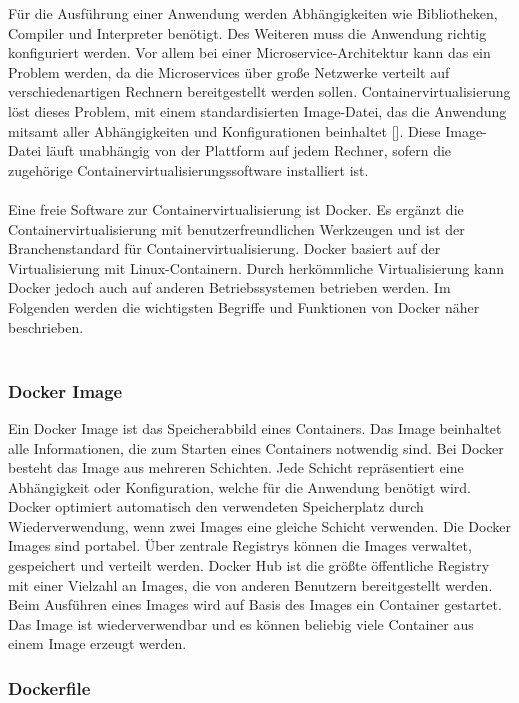 Für die Ausführung einer Anwendung werden Abhängigkeiten wie Bibliotheken, Compiler und Interpreter benötigt. Des Weiteren muss die Anwendung richtig konfiguriert werden. Vor allem bei einer Microservice-Architektur kann das ein Problem werden, da die Microservices über große Netzwerke verteilt auf verschiedenartigen Rechnern bereitgestellt werden sollen. Containervirtualisierung löst dieses Problem, mit einem standardisierten Image-Datei, das die Anwendung mitsamt aller Abhängigkeiten und Konfigurationen beinhaltet [\cite[S. 9]{arundelCloud2019}]. Diese Image-Datei läuft unabhängig von der Plattform auf jedem Rechner, sofern die zugehörige Containervirtualisierungssoftware installiert ist. \\
\\
Eine freie Software zur Containervirtualisierung ist Docker. Es ergänzt die Containervirtualisierung mit benutzerfreundlichen Werkzeugen  und ist der Branchenstandard für Containervirtualisierung. Docker basiert auf der Virtualisierung mit Linux-Containern. Durch herkömmliche Virtualisierung kann Docker jedoch auch auf anderen Betriebssystemen betrieben werden. Im Folgenden werden die wichtigsten Begriffe und Funktionen von Docker näher beschrieben. \\
\\

\subsubsection{Docker Image}

Ein Docker Image ist das Speicherabbild eines Containers. Das Image beinhaltet alle Informationen, die zum Starten eines Containers notwendig sind.  Bei Docker besteht das Image aus mehreren Schichten. Jede Schicht repräsentiert eine Abhängigkeit oder Konfiguration, welche für die Anwendung benötigt wird. Docker optimiert automatisch den verwendeten Speicherplatz durch Wiederverwendung, wenn zwei Images eine gleiche Schicht verwenden. Die Docker Images sind portabel. Über zentrale Registrys können die Images verwaltet, gespeichert und verteilt werden. Docker Hub ist die größte öffentliche Registry mit einer Vielzahl an Images, die von anderen Benutzern bereitgestellt werden. Beim Ausführen eines Images wird auf Basis des Images ein Container gestartet. Das Image ist wiederverwendbar und es können beliebig viele Container aus einem Image erzeugt werden. 

\subsubsection{Dockerfile}

